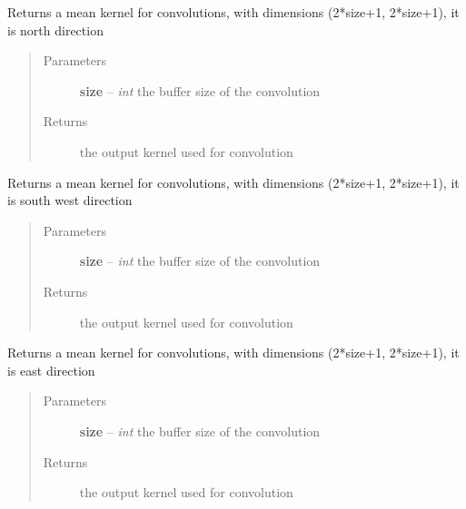 \documentclass[letterpaper,10pt,english]{sphinxmanual}
\begin{document}

\begin{fulllineitems}
\label{docs/shielding:shield_mult.init_kern}
Returns a mean kernel for convolutions, with dimensions
(2*size+1, 2*size+1), it is north direction
\begin{quote}\begin{description}
\item[{Parameters}] \leavevmode
\textbf{size} -- \emph{int} the buffer size of the convolution

\item[{Returns}] \leavevmode
{} the output kernel used for convolution

\end{description}\end{quote}

\end{fulllineitems}



\begin{fulllineitems}
\label{docs/shielding:shield_mult.init_kern_diag}
Returns a mean kernel for convolutions, with dimensions
(2*size+1, 2*size+1), it is south west direction
\begin{quote}\begin{description}
\item[{Parameters}] \leavevmode
\textbf{size} -- \emph{int} the buffer size of the convolution

\item[{Returns}] \leavevmode
{} the output kernel used for convolution

\end{description}\end{quote}

\end{fulllineitems}



\begin{fulllineitems}
\label{docs/shielding:shield_mult.kern_e}
Returns a mean kernel for convolutions, with dimensions
(2*size+1, 2*size+1), it is east direction
\begin{quote}\begin{description}
\item[{Parameters}] \leavevmode
\textbf{size} -- \emph{int} the buffer size of the convolution

\item[{Returns}] \leavevmode
{} the output kernel used for convolution

\end{description}\end{quote}

\end{fulllineitems}
\end{document}
